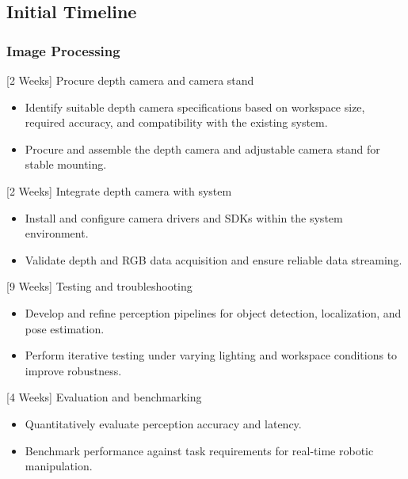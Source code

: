 \documentclass[12pt]{extarticle}
\begin{document}
\subsection{Initial Timeline}

\subsubsection{Image Processing}
[2 Weeks] Procure depth camera and camera stand
\begin{itemize}
\item Identify suitable depth camera specifications based on workspace size, required accuracy, and compatibility with the existing system.
\item Procure and assemble the depth camera and adjustable camera stand for stable mounting.
\end{itemize}
[2 Weeks] Integrate depth camera with system
\begin{itemize}
\item Install and configure camera drivers and SDKs within the system environment.
\item Validate depth and RGB data acquisition and ensure reliable data streaming.
\end{itemize}
[9 Weeks] Testing and troubleshooting
\begin{itemize}
\item Develop and refine perception pipelines for object detection, localization, and pose estimation.
\item Perform iterative testing under varying lighting and workspace conditions to improve robustness.
\end{itemize}
[4 Weeks] Evaluation and benchmarking
\begin{itemize}
\item Quantitatively evaluate perception accuracy and latency.
\item Benchmark performance against task requirements for real-time robotic manipulation.
\end{itemize}
\end{document}

